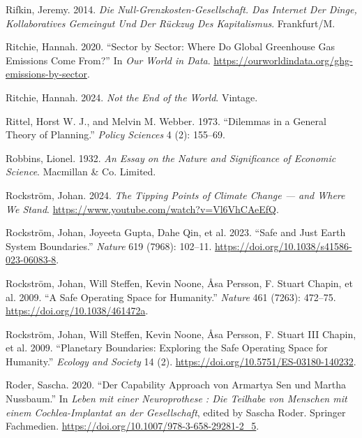 \documentclass[
  a4paper,
  DIV=11,
  numbers=noendperiod,
  oneside,
  openany]{scrreprt}
\newlength{\cslhangindent}
\newenvironment{CSLReferences}[2] %
 {\begin{list}{}{%
  \setlength{\itemindent}{0pt}
  \setlength{\leftmargin}{0pt}
  \setlength{\parsep}{0pt}
  \ifodd #1
   \setlength{\leftmargin}{\cslhangindent}
   \setlength{\itemindent}{-1\cslhangindent}
  \fi
  \setlength{\itemsep}{#2\baselineskip}}}
 {\end{list}}
\begin{document}
\begin{CSLReferences}{1}{1}
Rifkin, Jeremy. 2014. \emph{Die {Null-Grenzkosten-Gesellschaft}. {Das
Internet} Der {Dinge}, Kollaboratives {Gemeingut} Und Der {R{ü}ckzug}
Des {Kapitalismus}}. Frankfurt/M.

Ritchie, Hannah. 2020. {``Sector by Sector: Where Do Global Greenhouse
Gas Emissions Come From?''} In \emph{Our World in Data}.
\url{https://ourworldindata.org/ghg-emissions-by-sector}.

Ritchie, Hannah. 2024. \emph{Not the {End} of the {World}}. Vintage.

Rittel, Horst W. J., and Melvin M. Webber. 1973. {``Dilemmas in a
{General Theory} of {Planning}.''} \emph{Policy Sciences} 4 (2):
155--69.

Robbins, Lionel. 1932. \emph{An {Essay} on the {Nature} and
{Significance} of {Economic Science}}. Macmillan \& Co. Limited.

Rockström, Johan. 2024. \emph{The {Tipping} {Points} of {Climate}
{Change} --- and {Where} {We} {Stand}}.
\url{https://www.youtube.com/watch?v=Vl6VhCAeEfQ}.

Rockström, Johan, Joyeeta Gupta, Dahe Qin, et al. 2023. {``Safe and Just
{Earth} System Boundaries.''} \emph{Nature} 619 (7968): 102--11.
\url{https://doi.org/10.1038/s41586-023-06083-8}.

Rockström, Johan, Will Steffen, Kevin Noone, Åsa Persson, F. Stuart
Chapin, et al. 2009. {``A Safe Operating Space for Humanity.''}
\emph{Nature} 461 (7263): 472--75.
\url{https://doi.org/10.1038/461472a}.

{Rockström, Johan, Will Steffen, Kevin Noone, Åsa Persson, F. Stuart III
Chapin, et al.} 2009. {``Planetary {Boundaries}: {Exploring} the {Safe
Operating Space} for {Humanity}.''} \emph{Ecology and Society} 14 (2).
\url{https://doi.org/10.5751/ES-03180-140232}.

Roder, Sascha. 2020. {``{Der Capability Approach von Armartya Sen und
Martha Nussbaum}.''} In \emph{{Leben mit einer Neuroprothese : Die
Teilhabe von Menschen mit einem Cochlea-Implantat an der Gesellschaft}},
edited by Sascha Roder. Springer Fachmedien.
\url{https://doi.org/10.1007/978-3-658-29281-2_5}.


\end{CSLReferences}
\end{document}
